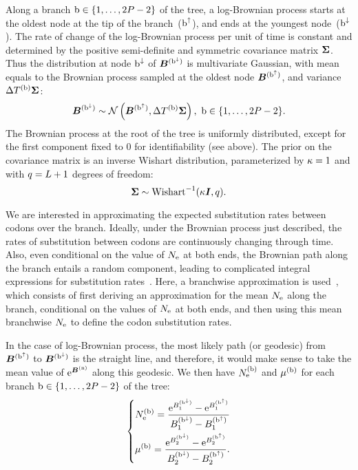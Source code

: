 Along a branch $\text{b} \in \{1, \hdots, 2 P - 2\}$ of the tree, a log-Brownian process starts at the oldest node at the tip of the branch~($\text{b}^{\uparrow}$), and ends at the youngest node~($\text{b}^{\downarrow}$).
The rate of change of the log-Brownian process per unit of time is constant and determined by the positive semi-definite and symmetric covariance matrix $\bm{\Sigma}$. Thus the distribution at node $\text{b}^{\downarrow}$ of $\bm{B}^{(\text{b}^{\downarrow})}$ is multivariate Gaussian, with mean equals to the Brownian process sampled at the oldest node $\bm{B}^{(\text{b}^{\uparrow})}$, and variance $\Delta T^{(\text{b})} \bm{\Sigma}$:
\begin{equation}
    \label{eq:DistribBrownian}
    \Brownian^{(\nodeDown)} \sim \mathcal{N}\left(\Brownian^{(\nodeUp)}, \branchtime\branchexp \CovarianceMatrix \right),\ \Setbranch.
\end{equation}
The Brownian process at the root of the tree is uniformly distributed, except for the first component fixed to $0$ for identifiability (see above).
The {prior} on the covariance matrix is an inverse Wishart distribution, parameterized by $\kappa=1$ and with $q=L + 1$ degrees of freedom:
\begin{equation}
    \label{eq:Distribcovariance}
    \CovarianceMatrix \sim \text{Wishart}^{-1} (\covariancekappa \Identitymatrix, \covariancedf).
\end{equation}

We are interested in approximating the expected substitution rates between codons over the branch.
Ideally, under the Brownian process just described, the rates of substitution between codons are continuously changing through time.
Also, even conditional on the value of $N_{\text{e}}$ at both ends, the Brownian path along the branch entails a random component, leading to complicated integral expressions for substitution rates~\citep{Horvilleur2014}.
Here, a branchwise approximation is used~\citep{Lartillot2011}, which consists of first deriving an approximation for the mean $N_{\text{e}}$ along the branch, conditional on the values of $N_{\text{e}}$ at both ends, and then using this mean branchwise $N_{\text{e}}$ to define the codon substitution rates.

In the case of log-Brownian process, the most likely path (or geodesic) from $\bm{B}^{(\text{b}^{\uparrow})}$ to $\bm{B}^{(\text{b}^{\downarrow})}$ is the straight line, and therefore, it would make sense to take the mean value of $\text{e}^{\bm{B}^{(\text{n})}}$ along this geodesic.
We then have $N_{\text{e}}^{(\text{b})}$ and $\mu^{(\text{b})}$ for each branch $\text{b} \in \{1, \hdots, 2 P - 2\}$ of the tree:
\begin{equation}
    \label{eq:branchNemu}
    \begin{dcases}
        \Ne\branchexp = \dfrac{\e^{\brownian_{1}^{(\nodeDown)}} - \e^{\brownian_{1}^{(\nodeUp)}}}{\brownian_{1}^{(\nodeDown)} - \brownian_{1}^{(\nodeUp)}} \\
        \mu\branchexp = \dfrac{\e^{\brownian_{2}^{(\nodeDown)}} - \e^{\brownian_{2}^{(\nodeUp)}}}{\brownian_{2}^{(\nodeDown)} - \brownian_{2}^{(\nodeUp)}}.
    \end{dcases}
\end{equation}

